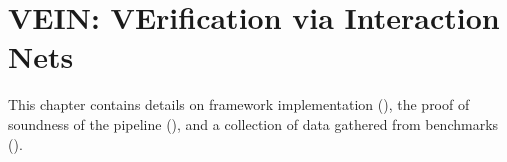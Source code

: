 \chapter{VEIN: VErification via Interaction Nets}
\label{ch:core}

This chapter contains details on framework implementation (\textbf{}), the
proof of soundness of the pipeline (\textbf{}), and a collection of data
gathered from benchmarks (\textbf{}).






